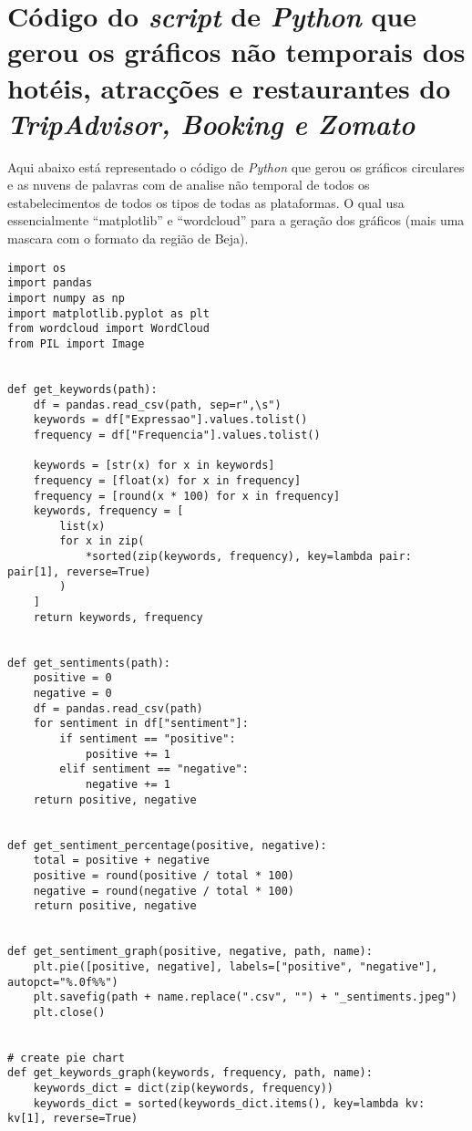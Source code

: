 \chapter{Código do \textit{script} de \textit{Python} que gerou os gráficos não temporais dos hotéis, atracções e restaurantes do \textit{TripAdvisor,  Booking e Zomato}}
\label{ap10}

Aqui abaixo está representado o código de \textit{Python} que gerou os gráficos circulares e as nuvens de palavras com
de analise não temporal de todos os estabelecimentos de todos os tipos de todas as plataformas. O qual usa essencialmente ``matplotlib'' e ``wordcloud'' para a geração dos gráficos (mais uma mascara com o formato da região de Beja).

\begin{verbatim}
import os
import pandas
import numpy as np
import matplotlib.pyplot as plt
from wordcloud import WordCloud
from PIL import Image


def get_keywords(path):
    df = pandas.read_csv(path, sep=r",\s")
    keywords = df["Expressao"].values.tolist()
    frequency = df["Frequencia"].values.tolist()

    keywords = [str(x) for x in keywords]
    frequency = [float(x) for x in frequency]
    frequency = [round(x * 100) for x in frequency]
    keywords, frequency = [
        list(x)
        for x in zip(
            *sorted(zip(keywords, frequency), key=lambda pair: pair[1], reverse=True)
        )
    ]
    return keywords, frequency


def get_sentiments(path):
    positive = 0
    negative = 0
    df = pandas.read_csv(path)
    for sentiment in df["sentiment"]:
        if sentiment == "positive":
            positive += 1
        elif sentiment == "negative":
            negative += 1
    return positive, negative


def get_sentiment_percentage(positive, negative):
    total = positive + negative
    positive = round(positive / total * 100)
    negative = round(negative / total * 100)
    return positive, negative


def get_sentiment_graph(positive, negative, path, name):
    plt.pie([positive, negative], labels=["positive", "negative"], autopct="%.0f%%")
    plt.savefig(path + name.replace(".csv", "") + "_sentiments.jpeg")
    plt.close()


# create pie chart
def get_keywords_graph(keywords, frequency, path, name):
    keywords_dict = dict(zip(keywords, frequency))
    keywords_dict = sorted(keywords_dict.items(), key=lambda kv: kv[1], reverse=True)


\end{verbatim}
